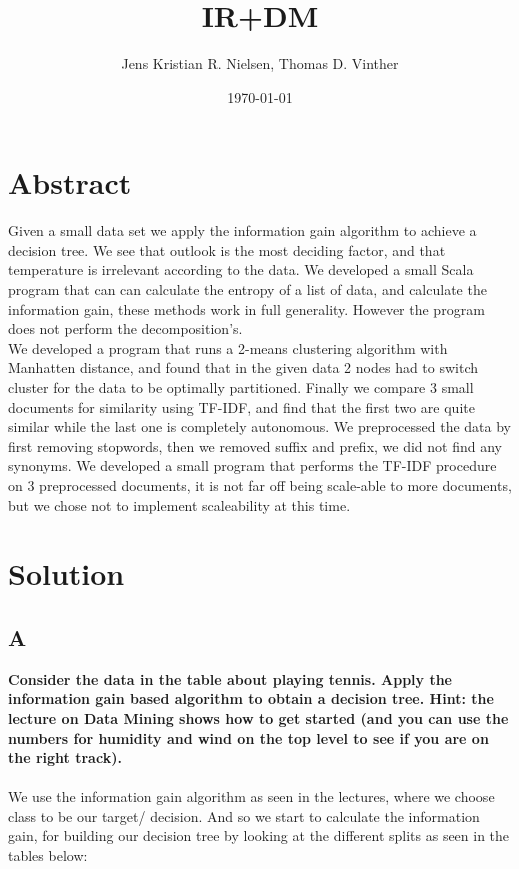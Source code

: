 \documentclass{article}
\title{IR+DM}
\author{Jens Kristian R. Nielsen, Thomas D. Vinther}
\date{\today}
\theoremstyle{remark}
\begin{document}
	
	\maketitle
	
	\section{Abstract}
	Given a small data set we apply the information gain algorithm to achieve a decision tree. We see that outlook is the most deciding factor, and that temperature is irrelevant according to the data. We developed a small Scala program that can can calculate the entropy of a list of data, and calculate the information gain, these methods work in full generality. However the program does not perform the decomposition's.\\
	We developed a program that runs a 2-means clustering algorithm with Manhatten distance, and found that in the given data 2 nodes had to switch cluster for the data to be optimally partitioned.
	Finally we compare 3 small documents for similarity using TF-IDF, and find that the first two are quite similar while the last one is completely autonomous. We preprocessed the data by first removing stopwords, then we removed suffix and prefix, we did not find any synonyms. We developed a small program that performs the TF-IDF procedure on 3 preprocessed documents, it is not far off being scale-able to more documents, but we chose not to implement scaleability at this time.
	\newpage\section{Solution}
	\subsection{A}
	\textbf{Consider the data in the table about playing tennis. Apply the information gain based algorithm to obtain a decision tree. Hint: the lecture on Data Mining shows how to get started (and you can use the numbers for humidity and wind on the top level to see if you are on the right track).}\\\\
	
	We use the information gain algorithm as seen in the lectures, where we choose class to be our target/ decision.  And so we start to calculate the information gain, for building our decision tree by looking at the different splits as seen in the tables below:\\
	
\end{document}
